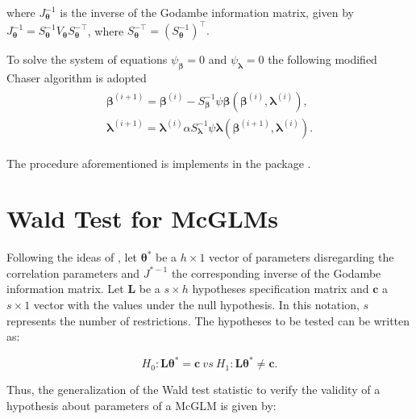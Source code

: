 \documentclass[article]{jss}\usepackage[]{graphicx}\usepackage[]{xcolor}
\begin{document}
\noindent where $J_{\boldsymbol{\theta}}^{-1}$ is the inverse of the Godambe information matrix, given by $J_{\boldsymbol{\theta}}^{-1} = S_{\boldsymbol{\theta}}^{-1} V_{\boldsymbol{\theta}} S_{\boldsymbol{\theta}}^{-\top}$, where $S_{\boldsymbol{\theta}}^{-\top} = (S_{\boldsymbol{\theta}}^{-1})^{\top}.$

To solve the system of equations $\psi_{\boldsymbol{\beta}} = 0$ and $\psi_{\boldsymbol{\lambda}} = 0$ the following modified Chaser algorithm is adopted 
$$
\begin{aligned}
\begin{matrix}
\boldsymbol{\beta}^{(i+1)} = \boldsymbol{\beta}^{(i)}- S_{\boldsymbol{\beta}}^{-1} \psi \boldsymbol{\beta} (\boldsymbol{\beta}^{(i)}, \boldsymbol{\lambda}^{(i)}), \\ 
\boldsymbol{\lambda}^{(i+1)} = \boldsymbol{\lambda}^{(i)}\alpha S_{\boldsymbol{\lambda}}^{-1} \psi \boldsymbol{\lambda} (\boldsymbol{\beta}^{(i+1)}, \boldsymbol{\lambda}^{(i)}).
\end{matrix}
\end{aligned}
$$

The procedure aforementioned is implements in the  package \citep{mcglm}.


\section{Wald Test for McGLMs}\label{sec:wald}

Following the ideas of \citet{htmcglm_proposta}, let $\boldsymbol{\theta^{*}}$ be a $h \times 1$ vector of parameters disregarding the correlation parameters and $J^{\boldsymbol{*}-1}$ the corresponding inverse of the Godambe information matrix. Let $\boldsymbol{L}$ be a $s \times h$ hypotheses specification matrix and $\boldsymbol{c}$ a $s \times 1$ vector with the values under the null hypothesis. In this notation, $s$ represents the number of restrictions. The hypotheses to be tested can be written as:

\begin{equation}
\label{eq:hipoteses_wald}
H_0: \boldsymbol{L}\boldsymbol{\theta^{*}} = \boldsymbol{c} \ vs \ H_1: \boldsymbol{L}\boldsymbol{\theta^{*}} \neq \boldsymbol{c}. 
\end{equation}

\noindent Thus, the generalization of the Wald test statistic to verify the validity of a hypothesis about parameters of a McGLM is given by:
\end{document}
